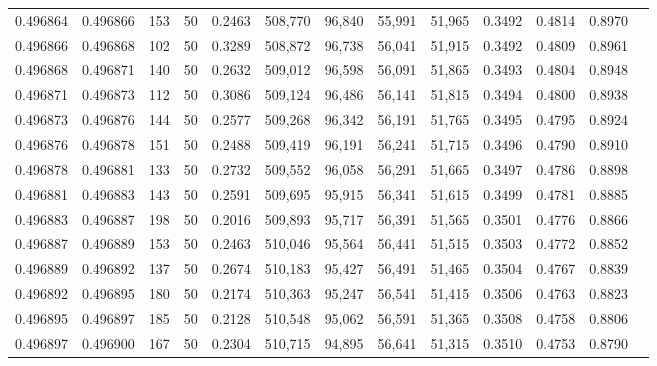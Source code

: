 \begin{tabular}{rrrrrrrrrrrrr}
0.496864 & 0.496866 &   153 &  50 &                                     0.2463 & 508,770 &  96,840 &  55,991 &  51,965 & 0.3492 & 0.4814 & 0.8970 \\
0.496866 & 0.496868 &   102 &  50 &                                     0.3289 & 508,872 &  96,738 &  56,041 &  51,915 & 0.3492 & 0.4809 & 0.8961 \\
0.496868 & 0.496871 &   140 &  50 &                                     0.2632 & 509,012 &  96,598 &  56,091 &  51,865 & 0.3493 & 0.4804 & 0.8948 \\
0.496871 & 0.496873 &   112 &  50 &                                     0.3086 & 509,124 &  96,486 &  56,141 &  51,815 & 0.3494 & 0.4800 & 0.8938 \\
0.496873 & 0.496876 &   144 &  50 &                                     0.2577 & 509,268 &  96,342 &  56,191 &  51,765 & 0.3495 & 0.4795 & 0.8924 \\
0.496876 & 0.496878 &   151 &  50 &                                     0.2488 & 509,419 &  96,191 &  56,241 &  51,715 & 0.3496 & 0.4790 & 0.8910 \\
0.496878 & 0.496881 &   133 &  50 &                                     0.2732 & 509,552 &  96,058 &  56,291 &  51,665 & 0.3497 & 0.4786 & 0.8898 \\
0.496881 & 0.496883 &   143 &  50 &                                     0.2591 & 509,695 &  95,915 &  56,341 &  51,615 & 0.3499 & 0.4781 & 0.8885 \\
0.496883 & 0.496887 &   198 &  50 &                                     0.2016 & 509,893 &  95,717 &  56,391 &  51,565 & 0.3501 & 0.4776 & 0.8866 \\
0.496887 & 0.496889 &   153 &  50 &                                     0.2463 & 510,046 &  95,564 &  56,441 &  51,515 & 0.3503 & 0.4772 & 0.8852 \\
0.496889 & 0.496892 &   137 &  50 &                                     0.2674 & 510,183 &  95,427 &  56,491 &  51,465 & 0.3504 & 0.4767 & 0.8839 \\
0.496892 & 0.496895 &   180 &  50 &                                     0.2174 & 510,363 &  95,247 &  56,541 &  51,415 & 0.3506 & 0.4763 & 0.8823 \\
0.496895 & 0.496897 &   185 &  50 &                                     0.2128 & 510,548 &  95,062 &  56,591 &  51,365 & 0.3508 & 0.4758 & 0.8806 \\
0.496897 & 0.496900 &   167 &  50 &                                     0.2304 & 510,715 &  94,895 &  56,641 &  51,315 & 0.3510 & 0.4753 & 0.8790 \\

\end{tabular}
